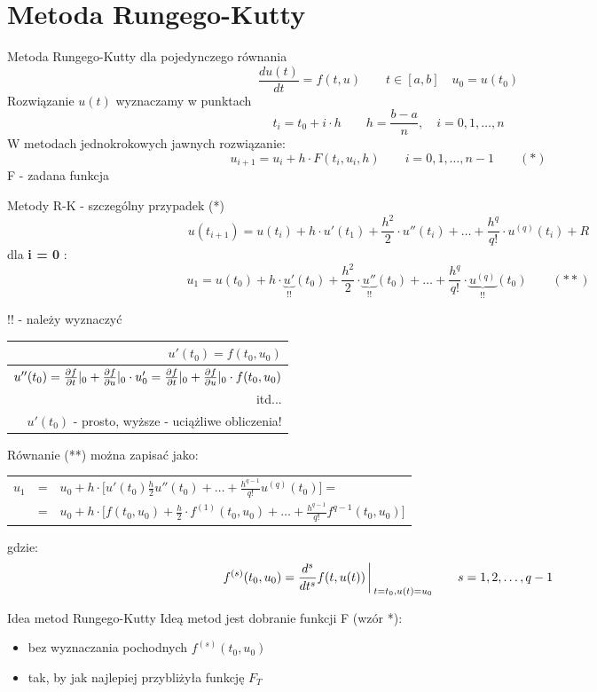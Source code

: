 \section{Metoda Rungego-Kutty}
\begin{frame}{Metoda Rungego-Kutty dla pojedynczego równania}
	$$\frac{du(t)}{dt}=f(t,u)\qquad t \in [a,b] \quad u_0 = u(t_0)$$
    Rozwiązanie $u(t)$ wyznaczamy w punktach
    $$t_i = t_0+i\cdot h \qquad h=\frac{b-a}{n}, \quad i = 0,1,\ldots,n$$
    W metodach jednokrokowych jawnych rozwiązanie:
    $$u_{i+1} = u_i + h\cdot F(t_i,u_i,h) \qquad i = 0,1,\ldots,n-1 \qquad(*)$$
    F - zadana funkcja
\end{frame}
\begin{frame}{Metody R-K - szczególny przypadek (*)}
	$$u(t_{i+1}) = u(t_i)+h\cdot u'(t_1)+\frac{h^2}{2}\cdot u''(t_i)+\ldots+\frac{h^q}{q!}\cdot u^{(q)}(t_i) + R$$
    dla \textbf{i = 0} :
    $$u_1 = u(t_0) + h\cdot \underbrace{u'}_{!!}(t_0)+\frac{h^2}{2}\cdot\underbrace{u''}_{!!}(t_0)+\ldots+\frac{h^q}{q!}\cdot \underbrace{u^{(q)}}_{!!}(t_0) \qquad (**) $$
    \begin{flushright}
    	!! - należy wyznaczyć
    \end{flushright}
    \begin{center}
    	\begin{tabular}{|r|} \hline
    		$u'(t_0)=f(t_0,u_0)$\\ \hline
        	$u''(t_0) = \frac{\partial f}{\partial t}\arrowvert_0+\frac{\partial f}{\partial u}\arrowvert_0 \cdot u'_0 = \frac{\partial f}{\partial t}\arrowvert_0 + \frac{\partial f}{\partial u}\arrowvert_0 \cdot f(t_0,u_0)$\\ \hline
        itd... \\ \hline
       		$u'(t_0)$ - prosto, wyższe - uciążliwe obliczenia!\\ \hline
    	\end{tabular}
    \end{center}
\end{frame}
\begin{frame}
	Równanie (**) można zapisać jako:
    \begin{tabular}{ccl}
    $u_1$ & = & $u_0+h \cdot \bigg[u'(t_0)\frac{h}{2}u''(t_0) +\ldots+\frac{h^{q-1}}{q!}u^{(q)}(t_0)\bigg] =$\\
     & = & $u_0 + h \cdot \bigg[f(t_0,u_0)+\frac{h}{2}\cdot f^{(1)}(t_0,u_0)+\ldots+\frac{h^{q-1}}{q!}f^{q-1}(t_0,u_0)\bigg]$
    \end{tabular}
    gdzie:
    $$f^{(s)}(t_0,u_0) = \frac{d^s}{dt^s}f(t,u(t))\bigg\arrowvert_{t=t_0, u(t)=u_0} \qquad s = 1,2,\ldots,q-1$$
    \begin{block}{Idea metod Rungego-Kutty}
    Ideą metod jest dobranie funkcji F (wzór *):
    	\begin{itemize}
          \item bez wyznaczania pochodnych $f^{(s)}(t_0,u_0)$
          \item tak, by jak najlepiej przybliżyła funkcję $F_T$
    	\end{itemize}
    \end{block}
\end{frame}
